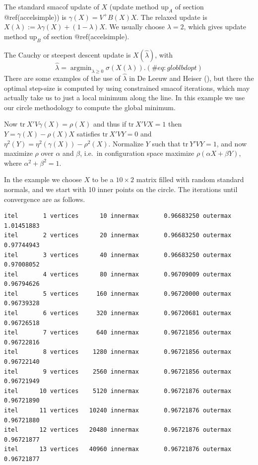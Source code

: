 \documentclass[
  12pt,
  letterpaper,
  DIV=11,
  numbers=noendperiod]{scrreprt}
\theoremstyle{remark}
\begin{document}
The standard smacof update of \(X\) (update method \(\text{up}_A\) of
section @ref(accelsimple)) is \(\gamma(X)=V^+B(X)X\). The relaxed update
is \(X(\lambda):=\lambda \gamma(X)+(1-\lambda)X\). We usually choose
\(\lambda=2\), which gives update method \(\text{up}_B\) of section
@ref(accelsimple).

The Cauchy or steepest descent update is \(X(\hat\lambda)\), with
\begin{equation}
\hat\lambda=\mathop{\text{argmin}}_{\lambda\geq 0}\sigma(X(\lambda)).
(\#eq:globlbdopt)
\end{equation} There are some examples of the use of \(\hat\lambda\) in
De Leeuw and Heiser (), but
there the optimal step-size is computed by using constrained smacof
iterations, which may actually take us to just a local minimum along the
line. In this example we use our circle methodology to compute the
global minimum.

Now \(\text{tr}\ X'V\gamma(X)=\rho(X)\) and thus if
\(\text{tr}\ X'VX=1\) then \(Y=\gamma(X)-\rho(X)X\) satisfies
\(\text{tr}\ X'VY=0\) and \(\eta^2(Y)=\eta^2(\gamma(X))-\rho^2(X)\).
Normalize \(Y\) such that \(\text{tr}\ Y'VY=1\), and now maximize
\(\rho\) over \(\alpha\) and \(\beta\), i.e.~in configuration space
maximize \(\rho(\alpha X+\beta Y)\), where \(\alpha^2+\beta^2=1\).

In the example we choose \(X\) to be a \(10\times 2\) matrix filled with
random standard normals, and we start with 10 inner points on the
circle. The iterations until convergence are as follows.

\begin{verbatim}
itel       1 vertices      10 innermax       0.96683250 outermax       1.01451883 
itel       2 vertices      20 innermax       0.96683250 outermax       0.97744943 
itel       3 vertices      40 innermax       0.96683250 outermax       0.97008052 
itel       4 vertices      80 innermax       0.96709009 outermax       0.96794626 
itel       5 vertices     160 innermax       0.96720000 outermax       0.96739328 
itel       6 vertices     320 innermax       0.96720681 outermax       0.96726518 
itel       7 vertices     640 innermax       0.96721856 outermax       0.96722816 
itel       8 vertices    1280 innermax       0.96721856 outermax       0.96722140 
itel       9 vertices    2560 innermax       0.96721856 outermax       0.96721949 
itel      10 vertices    5120 innermax       0.96721876 outermax       0.96721890 
itel      11 vertices   10240 innermax       0.96721876 outermax       0.96721880 
itel      12 vertices   20480 innermax       0.96721876 outermax       0.96721877 
itel      13 vertices   40960 innermax       0.96721876 outermax       0.96721877 
\end{verbatim}
\end{document}
